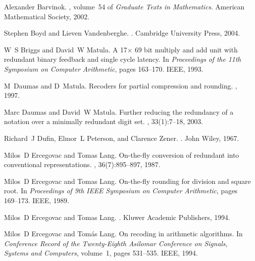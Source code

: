 \documentclass[10pt]{article}
\theoremstyle{definition}
\theoremstyle{remark}
\numberwithin{equation}{section}
\begin{document}
\begin{thebibliography}{10}

Alexander Barvinok.
, volume~54 of {\em Graduate Texts in
  Mathematics}.
\newblock American Mathematical Society, 2002.

Stephen Boyd and Lieven Vandenberghe.
.
\newblock Cambridge University Press, 2004.

W~S Briggs and David~W Matula.
\newblock A 17$\times$ 69 bit multiply and add unit with redundant binary
  feedback and single cycle latency.
\newblock In {\em Proceedings of the 11th Symposium on Computer Arithmetic},
  pages 163--170. IEEE, 1993.

M~Daumas and D~Matula.
\newblock Recoders for partial compression and rounding.
, 1997.

Marc Daumas and David~W Matula.
\newblock Further reducing the redundancy of a notation over a minimally
  redundant digit set.
, 33(1):7--18, 2003.

Richard~J Dufin, Elmor~L Peterson, and Clarence Zener.
.
\newblock John Wiley, 1967.

Milos~D Ercegovac and Tomas Lang.
\newblock On-the-fly conversion of redundant into conventional representations.
, 36(7):895--897, 1987.

Milos~D Ercegovac and Tomas Lang.
\newblock On-the-fly rounding for division and square root.
\newblock In {\em Proceedings of 9th IEEE Symposium on Computer Arithmetic},
  pages 169--173. IEEE, 1989.

Milos~D Ercegovac and Tomas Lang.
.
\newblock Kluwer Academic Publishers, 1994.

Milos~D Ercegovac and Tom{\'a}s Lang.
\newblock On recoding in arithmetic algorithms.
\newblock In {\em Conference Record of the Twenty-Eighth Asilomar Conference on
  Signals, Systems and Computers}, volume~1, pages 531--535. IEEE, 1994.


\end{thebibliography}
\end{document}
